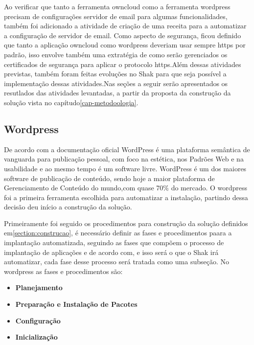 Ao verificar que tanto a ferramenta owncloud como a ferramenta wordpress precisam
de configurações servidor de email para algumas funcionalidades, também foi adicionado
a atividade de criação de uma receita para a automatizar a configuração de
servidor de email. Como aspecto de segurança, ficou definido que tanto a aplicação
owncloud como wordpress deveriam usar sempre https por padrão, isso envolve também
uma extratégia de como serão gerenciados os certificados de segurança para aplicar
o protocolo https.Além dessas atividades previstas, também foram feitas evoluções
no Shak para que seja possível a implementação dessas atividades.Nas seções a
seguir serão apresentados os resutlados das atividades levantadas, a partir da
proposta da construção da solução vista no capítudo\ref{cap-metodoologia}.


\subsection{Wordpress}
\label{sub:wordpress}

De acordo com a documentação oficial\cite{wordpress} WordPress é uma plataforma
semântica de vanguarda para publicação pessoal, com foco na estética, nos
Padrões Web e na usabilidade e ao mesmo tempo é um software livre. WordPress é
um dos maiores software de publicação de conteúdo, sendo hoje a maior
plataforma de Gerenciamento de Conteúdo do mundo,com quase 70\% do mercado. O
wordpress foi a primeira ferramenta escolhida para automatizar a instalação, partindo
dessa decisão deu início a construção da solução.

Primeiramente foi seguido os procedimentos para construção da solução definidos em\ref{section:construcao}, é
necessário definir as fases e procedimentos paara a implantação automatizada,
seguindo as fases que compõem o processo de implantação de aplicações e de acordo
 com\cite{omg2006}, e isso será o que o Shak irá automatizar, cada fase desse processo
 será  tratada como uma subseção. No wordpress as fases e procedimentos são:

\begin{itemize}
  \item  \textbf{Planejamento}
  \item  \textbf{Preparação e Instalação de Pacotes}
  \item  \textbf{Configuração}
  \item  \textbf{Inicialização}
\end{itemize}


